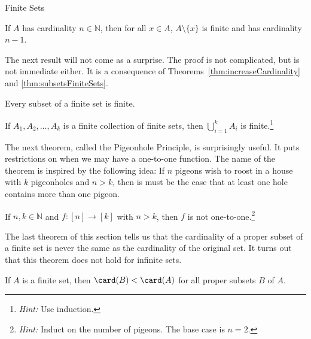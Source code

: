 \begin{section}{Finite Sets}
\begin{theorem}
If $A$ has cardinality $n\in\mathbb{N}$, then for all $x\in A$, $A\setminus \{x\}$ is finite and has cardinality $n-1$. 
\end{theorem}

The next result will not come as a surprise. The proof is not complicated, but is not immediate either. It is a consequence of Theorems~\ref{thm:increaseCardinality} and \ref{thm:subsetsFiniteSets}.

\begin{theorem}
Every subset of a finite set is finite.
\end{theorem}

\begin{theorem}
If $A_1,A_2,\ldots, A_k$ is a finite collection of finite sets, then $\displaystyle \bigcup_{i=1}^k A_i$ is finite.\footnote{\emph{Hint:} Use induction.}
\end{theorem}

The next theorem, called the Pigeonhole Principle, is surprisingly useful. It puts restrictions on when we may have a one-to-one function. The name of the theorem is inspired by the following idea: If $n$ pigeons wish to roost in a house with $k$ pigeonholes and $n>k$, then is must be the case that at least one hole contains more than one pigeon.

\begin{theorem}
If $n,k\in\mathbb{N}$ and $f:[n]\to [k]$ with $n>k$, then $f$ is not one-to-one.\footnote{\emph{Hint:} Induct on the number of pigeons. The base case is $n=2$.}
\end{theorem}

The last theorem of this section tells us that the cardinality of a proper subset of a finite set is never the same as the cardinality of the original set.  It turns out that this theorem does not hold for infinite sets. 

\begin{theorem}\label{thm:cardinalityProperSubsetsFinite}
If $A$ is a finite set, then $\card(B)<\card(A)$ for all proper subsets $B$ of $A$.
\end{theorem}

\end{section}